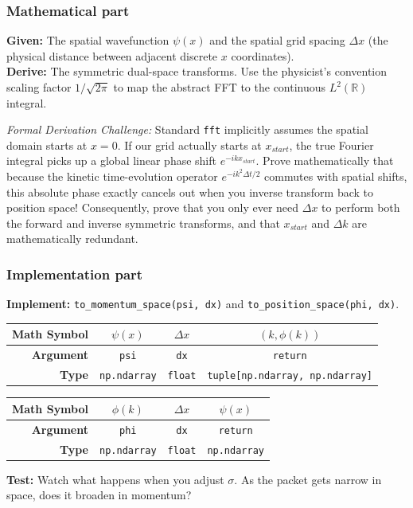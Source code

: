 \documentclass[11pt]{article}
\begin{document}
\subsubsection*{Mathematical part}
\textbf{Given:} The spatial wavefunction $\psi(x)$ and the spatial grid spacing $\Delta x$ (the physical distance between adjacent discrete $x$ coordinates). \\
\textbf{Derive:} The symmetric dual-space transforms. Use the physicist's convention scaling factor $1/\sqrt{2\pi}$ to map the abstract FFT to the continuous $L^2(\mathbb{R})$ integral.

\textit{Formal Derivation Challenge:} Standard \lstinline|fft| implicitly assumes the spatial domain starts at $x=0$. If our grid actually starts at $x_{start}$, the true Fourier integral picks up a global linear phase shift $e^{-i k x_{start}}$. Prove mathematically that because the kinetic time-evolution operator $e^{-i k^2 \Delta t / 2}$ commutes with spatial shifts, this absolute phase exactly cancels out when you inverse transform back to position space! Consequently, prove that you only ever need $\Delta x$ to perform both the forward and inverse symmetric transforms, and that $x_{start}$ and $\Delta k$ are mathematically redundant.

\subsubsection*{Implementation part}
\textbf{Implement:} \lstinline|to_momentum_space(psi, dx)| and \lstinline|to_position_space(phi, dx)|.
\begin{center}
\renewcommand{\arraystretch}{2.0}
\begin{tabular}{r | c | c | c}
\toprule
\textbf{Math Symbol} & $\psi(x)$ & $\Delta x$ & $(k, \phi(k))$ \\
\midrule
\textbf{Argument} & \lstinline|psi| & \lstinline|dx| & \lstinline|return| \\
\midrule
\textbf{Type} & \lstinline|np.ndarray| & \lstinline|float| & \lstinline|tuple[np.ndarray, np.ndarray]| \\
\bottomrule
\end{tabular}
\end{center}

\vspace{0.5cm}

\begin{center}
\renewcommand{\arraystretch}{2.0}
\begin{tabular}{r | c | c | c}
\toprule
\textbf{Math Symbol} & $\phi(k)$ & $\Delta x$ & $\psi(x)$ \\
\midrule
\textbf{Argument} & \lstinline|phi| & \lstinline|dx| & \lstinline|return| \\
\midrule
\textbf{Type} & \lstinline|np.ndarray| & \lstinline|float| & \lstinline|np.ndarray| \\
\bottomrule
\end{tabular}
\end{center}
\textbf{Test:} Watch what happens when you adjust $\sigma$. As the packet gets narrow in space, does it broaden in momentum?
\end{document}
